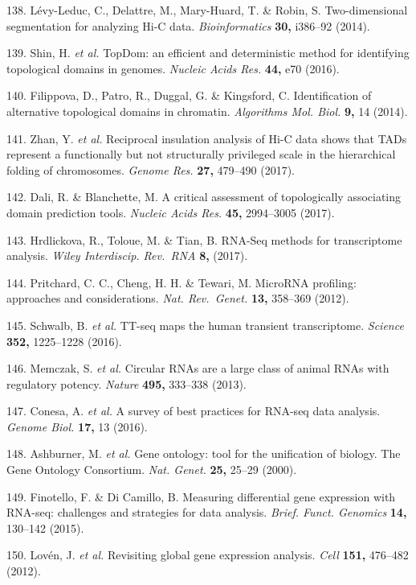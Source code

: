 \documentclass[11pt,twoside]{MPIthesis}
\theoremstyle{definition}
\theoremstyle{definition}
\theoremstyle{definition}
\theoremstyle{remark}
\begin{document}
138. Lévy-Leduc, C., Delattre, M., Mary-Huard, T. \& Robin, S.
Two-dimensional segmentation for analyzing Hi-C data.
\emph{Bioinformatics} \textbf{30,} i386--92 (2014).

139. Shin, H. \emph{et al.} TopDom: an efficient and deterministic
method for identifying topological domains in genomes. \emph{Nucleic
Acids Res.} \textbf{44,} e70 (2016).

140. Filippova, D., Patro, R., Duggal, G. \& Kingsford, C.
Identification of alternative topological domains in chromatin.
\emph{Algorithms Mol. Biol.} \textbf{9,} 14 (2014).

141. Zhan, Y. \emph{et al.} Reciprocal insulation analysis of Hi-C data
shows that TADs represent a functionally but not structurally privileged
scale in the hierarchical folding of chromosomes. \emph{Genome Res.}
\textbf{27,} 479--490 (2017).

142. Dali, R. \& Blanchette, M. A critical assessment of topologically
associating domain prediction tools. \emph{Nucleic Acids Res.}
\textbf{45,} 2994--3005 (2017).

143. Hrdlickova, R., Toloue, M. \& Tian, B. RNA-Seq methods for
transcriptome analysis. \emph{Wiley Interdiscip. Rev.~RNA} \textbf{8,}
(2017).

144. Pritchard, C. C., Cheng, H. H. \& Tewari, M. MicroRNA profiling:
approaches and considerations. \emph{Nat. Rev.~Genet.} \textbf{13,}
358--369 (2012).

145. Schwalb, B. \emph{et al.} TT-seq maps the human transient
transcriptome. \emph{Science} \textbf{352,} 1225--1228 (2016).

146. Memczak, S. \emph{et al.} Circular RNAs are a large class of animal
RNAs with regulatory potency. \emph{Nature} \textbf{495,} 333--338
(2013).

147. Conesa, A. \emph{et al.} A survey of best practices for RNA-seq
data analysis. \emph{Genome Biol.} \textbf{17,} 13 (2016).

148. Ashburner, M. \emph{et al.} Gene ontology: tool for the unification
of biology. The Gene Ontology Consortium. \emph{Nat. Genet.}
\textbf{25,} 25--29 (2000).

149. Finotello, F. \& Di Camillo, B. Measuring differential gene
expression with RNA-seq: challenges and strategies for data analysis.
\emph{Brief. Funct. Genomics} \textbf{14,} 130--142 (2015).

150. Lovén, J. \emph{et al.} Revisiting global gene expression analysis.
\emph{Cell} \textbf{151,} 476--482 (2012).
\end{document}
